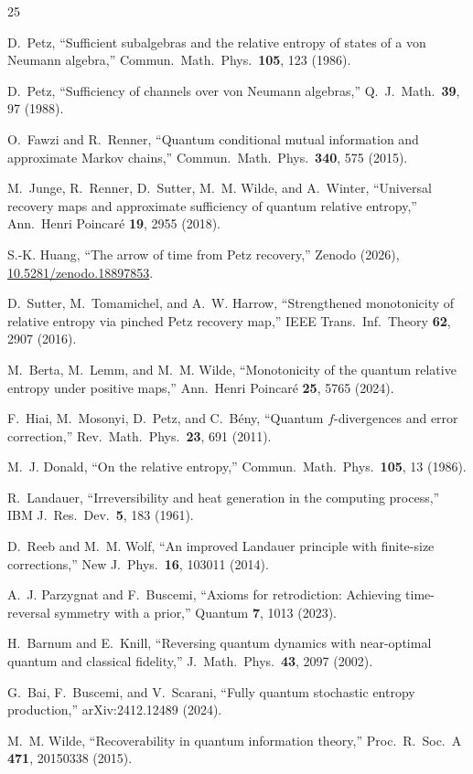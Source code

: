 \documentclass[prl,twocolumn,superscriptaddress,longbibliography,floatfix]{revtex4-2}
\begin{document}
\begin{thebibliography}{25}

D.~Petz,
``Sufficient subalgebras and the relative entropy of states of a
von Neumann algebra,''
Commun.\ Math.\ Phys.\ \textbf{105}, 123 (1986).

D.~Petz,
``Sufficiency of channels over von Neumann algebras,''
Q.\ J.\ Math.\ \textbf{39}, 97 (1988).

O.~Fawzi and R.~Renner,
``Quantum conditional mutual information and approximate Markov
chains,''
Commun.\ Math.\ Phys.\ \textbf{340}, 575 (2015).

M.~Junge, R.~Renner, D.~Sutter, M.~M. Wilde, and A.~Winter,
``Universal recovery maps and approximate sufficiency of quantum
relative entropy,''
Ann.\ Henri Poincar\'e \textbf{19}, 2955 (2018).

S.-K. Huang,
``The arrow of time from Petz recovery,''
Zenodo (2026), \href{https://doi.org/10.5281/zenodo.18897853}{10.5281/zenodo.18897853}.

D.~Sutter, M.~Tomamichel, and A.~W. Harrow,
``Strengthened monotonicity of relative entropy via pinched
Petz recovery map,''
IEEE Trans.\ Inf.\ Theory \textbf{62}, 2907 (2016).

M.~Berta, M.~Lemm, and M.~M. Wilde,
``Monotonicity of the quantum relative entropy under positive maps,''
Ann.\ Henri Poincar\'e \textbf{25}, 5765 (2024).

F.~Hiai, M.~Mosonyi, D.~Petz, and C.~B\'eny,
``Quantum $f$-divergences and error correction,''
Rev.\ Math.\ Phys.\ \textbf{23}, 691 (2011).

M.~J. Donald,
``On the relative entropy,''
Commun.\ Math.\ Phys.\ \textbf{105}, 13 (1986).

R.~Landauer,
``Irreversibility and heat generation in the computing process,''
IBM J.\ Res.\ Dev.\ \textbf{5}, 183 (1961).

D.~Reeb and M.~M. Wolf,
``An improved Landauer principle with finite-size corrections,''
New J.\ Phys.\ \textbf{16}, 103011 (2014).

A.~J. Parzygnat and F.~Buscemi,
``Axioms for retrodiction: Achieving time-reversal symmetry with a
prior,''
Quantum \textbf{7}, 1013 (2023).

H.~Barnum and E.~Knill,
``Reversing quantum dynamics with near-optimal quantum and classical
fidelity,''
J.\ Math.\ Phys.\ \textbf{43}, 2097 (2002).

G.~Bai, F.~Buscemi, and V.~Scarani,
``Fully quantum stochastic entropy production,''
arXiv:2412.12489 (2024).

M.~M. Wilde,
``Recoverability in quantum information theory,''
Proc.\ R.\ Soc.\ A \textbf{471}, 20150338 (2015).

\end{thebibliography}
\end{document}

